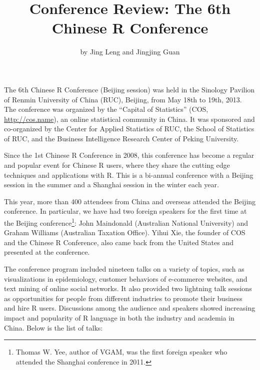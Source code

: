 \title{Conference Review: The 6th Chinese R Conference}
\author{by Jing Leng and Jingjing Guan}

\maketitle

The 6th Chinese R Conference (Beijing session) was held in the Sinology
Pavilion of Renmin University of China (RUC), Beijing, from May 18th to
19th, 2013. The conference was organized by the ``Capital of Statistics''
(COS, \url{http://cos.name}), an online statistical community in China. It
was sponsored and co-organized by the Center for Applied Statistics of RUC,
the School of Statistics of RUC, and the Business Intelligence Research
Center of Peking University.

Since the 1st Chinese R Conference in 2008, this conference has become a
regular and popular event for Chinese R users, where they share the cutting
edge techniques and applications with R. This is a bi-annual conference with
a Beijing session in the summer and a Shanghai session in the winter each
year.

This year, more than 400 attendees from China and overseas attended the
Beijing conference. In particular, we have had two foreign speakers for the
first time at the Beijing conference\footnote {Thomas W. Yee, author of \pkg
{VGAM}, was the first foreign speaker who attended the Shanghai conference
in 2011.}: John Maindonald (Australian National University) and Graham
Williams (Australian Taxation Office). Yihui Xie, the founder of COS and the
Chinese R Conference, also came back from the United States and presented at
the conference.

The conference program included nineteen talks on a variety of topics, such
as visualizations in epidemiology, customer behaviors of e-commerce
websites, and text mining of online social networks. It also provided two
lightning talk sessions as opportunities for people from different
industries to promote their business and hire R users. Discussions among the
audience and speakers showed increasing impact and popularity of R language
in both the industry and academia in China. Below is the list of talks:

